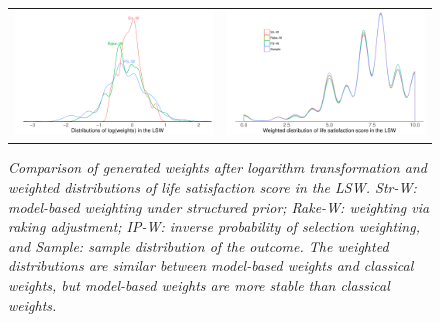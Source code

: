 \documentclass[11pt]{article}
\begin{document}
 \begin{figure}
\centering
\begin{tabular}{cc}
\includegraphics[width=.475\textwidth]{plot/weight-lsw.pdf}&\includegraphics[width=.475\textwidth]{plot/weighted-lsw-density.pdf}
\end{tabular}
\caption{\em Comparison of generated weights after logarithm transformation and weighted distributions of life satisfaction score in the LSW. Str-W: model-based weighting under structured prior; Rake-W: weighting via raking adjustment; IP-W: inverse probability of selection weighting, and Sample: sample distribution of the outcome. The weighted distributions are similar between model-based weights and classical weights, but model-based weights are more stable than classical weights.}
\label{lsw-weight}
\end{figure} 
\end{document}

